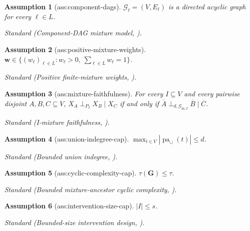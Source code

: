 \documentclass{article}
\newtheorem{assumption}{Assumption}
\begin{document}
\begin{assumption}[ass:component-dags]\label{ass:component-dags}
\(\mathcal G_\ell=(V,E_\ell)\) is a directed acyclic graph for every \(\ell\in L\).
\par\smallskip\noindent\emph{Standard} (Component-DAG mixture model, \cite{VariciKatzWeiSattigeriTajer2024Interventional}).
\end{assumption}

\begin{assumption}[ass:positive-mixture-weights]\label{ass:positive-mixture-weights}
\(\mathbf w\in\{(w_\ell)_{\ell\in L}:w_\ell>0,\ \sum_{\ell\in L}w_\ell=1\}\).
\par\smallskip\noindent\emph{Standard} (Positive finite-mixture weights, \cite{SaeedPanigrahiUhler2020MixtureDAGs}).
\end{assumption}

\begin{assumption}[ass:mixture-faithfulness]\label{ass:mixture-faithfulness}
For every \(I\subseteq V\) and every pairwise disjoint \(A,B,C\subseteq V\), \(X_A\perp_{P_I}X_B\mid X_C\) if and only if \(\overline A\perp_{d,\mathcal G_{\mathrm m,I}}\overline B\mid\overline C\).
\par\smallskip\noindent\emph{Standard} (I-mixture faithfulness, \cite{VariciKatzWeiSattigeriTajer2024Interventional}).
\end{assumption}

\begin{assumption}[ass:union-indegree-cap]\label{ass:union-indegree-cap}
\(\max_{t\in V}|\operatorname{pa}_{\cup}(t)|\le d\).
\par\smallskip\noindent\emph{Standard} (Bounded union indegree, \cite{VariciKatzWeiSattigeriTajer2024Interventional}).
\end{assumption}

\begin{assumption}[ass:cyclic-complexity-cap]\label{ass:cyclic-complexity-cap}
\(\tau(\mathbf G)\le\tau\).
\par\smallskip\noindent\emph{Standard} (Bounded mixture-ancestor cyclic complexity, \cite{VariciKatzWeiSattigeriTajer2024Interventional}).
\end{assumption}

\begin{assumption}[ass:intervention-size-cap]\label{ass:intervention-size-cap}
\(|I|\le s\).
\par\smallskip\noindent\emph{Standard} (Bounded-size intervention design, \cite{ShanmugamKocaogluDimakisVishwanath2015SmallInterventions}).
\end{assumption}
\end{document}
